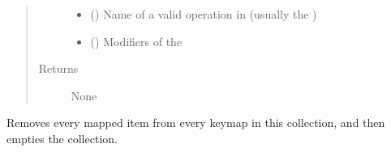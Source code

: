 \documentclass[letterpaper,10pt,english,openany,oneside]{sphinxmanual}
\begin{document}
\begin{fulllineitems}
\begin{fulllineitems}
\begin{quote}
\begin{description}
\begin{itemize}
\item {} 
 () \textendash{} Name of a valid operation in 
(usually the )

\item {} 
\sphinxstyleliteralstrong{\sphinxupquote{, }}\sphinxstyleliteralstrong{\sphinxupquote{, }} () \textendash{} Modifiers of the 

\end{itemize}

\item[{Returns}] \leavevmode
None

\end{description}\end{quote}

\end{fulllineitems}


\begin{fulllineitems}
\label{\detokenize{io_anim_mvnx:io_anim_mvnx.utils.KeymapManager.unregister}}
Removes every mapped item from every keymap in this collection, and
then empties the collection.

\end{fulllineitems}


\end{fulllineitems}

\end{document}
